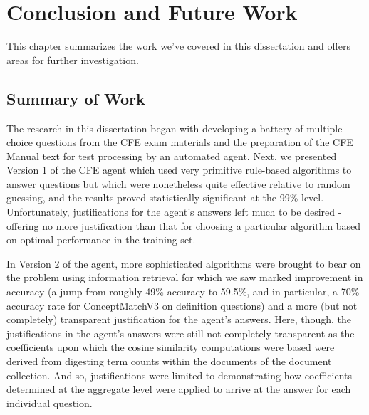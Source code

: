  

\chapter{Conclusion and Future Work}

This chapter summarizes the work we’ve covered in this dissertation and offers areas for further investigation.

\section{Summary of Work}

The research in this dissertation began with developing a battery of multiple choice questions from the CFE exam materials and the preparation of the CFE Manual text for test processing by an automated agent. Next, we presented Version 1 of the CFE agent which used very primitive rule-based algorithms to answer questions but which were nonetheless quite effective relative to random guessing, and the results proved statistically significant at the 99\% level. Unfortunately, justifications for the agent’s answers left much to be desired - offering no more justification than that for choosing a particular algorithm based on optimal performance in the training set.  

In Version 2 of the agent, more sophisticated algorithms were brought to bear on the problem using information retrieval for which we saw marked improvement in accuracy (a jump from roughly 49\% accuracy to 59.5\%, and in particular, a 70\% accuracy rate for ConceptMatchV3 on definition questions) and a more (but not completely) transparent justification for the agent’s answers. Here, though, the justifications in the agent’s answers were still not completely transparent as the coefficients upon which the cosine similarity computations were based were derived from digesting term counts within the documents of the document collection. And so, justifications were limited to demonstrating how coefficients determined at the aggregate level were applied to arrive at the answer for each individual question.


